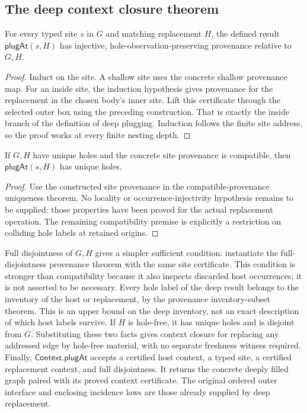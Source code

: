 \subsection{The deep context closure theorem}
\begin{theorem}
For every typed site $s$ in $G$ and matching replacement $H$, the defined result
$\mathsf{plugAt}(s,H)$ has injective, hole-observation-preserving provenance
relative to $G,H$.
\end{theorem}
\begin{proof}
Induct on the site. A shallow site uses the concrete shallow provenance map.
For an inside site, the induction hypothesis gives provenance for the replacement
in the chosen body's inner site. Lift this certificate through the selected
outer box using the preceding construction. That is exactly the inside branch
of the definition of deep plugging. Induction follows the finite site address,
so the proof works at every finite nesting depth.
\end{proof}

\begin{theorem}
If $G,H$ have unique holes and the concrete site provenance is compatible, then
$\mathsf{plugAt}(s,H)$ has unique holes.
\end{theorem}
\begin{proof}
Use the constructed site provenance in the compatible-provenance uniqueness
theorem. No locality or occurrence-injectivity hypothesis remains to be supplied:
those properties have been proved for the actual replacement operation.
The remaining compatibility premise is explicitly a restriction on colliding
hole labels at retained origins.
\end{proof}
Full disjointness of $G,H$ gives a simpler sufficient condition: instantiate the
full-disjointness provenance theorem with the same site certificate. This
condition is stronger than compatibility because it also inspects discarded host
occurrences; it is not asserted to be necessary.
Every hole label of the deep result belongs to the inventory of the host or
replacement, by the provenance inventory-subset theorem. This is an upper bound
on the deep inventory, not an exact description of which host labels survive.
If $H$ is hole-free, it has unique holes and is disjoint from $G$. Substituting
these two facts gives context closure for replacing any addressed edge by
hole-free material, with no separate freshness witness required.
Finally, $\mathsf{Context.plugAt}$ accepts a certified host context, a typed site,
a certified replacement context, and full disjointness. It returns the concrete
deeply filled graph paired with its proved context certificate. The original
ordered outer interface and enclosing incidence laws are those already supplied
by deep replacement.

